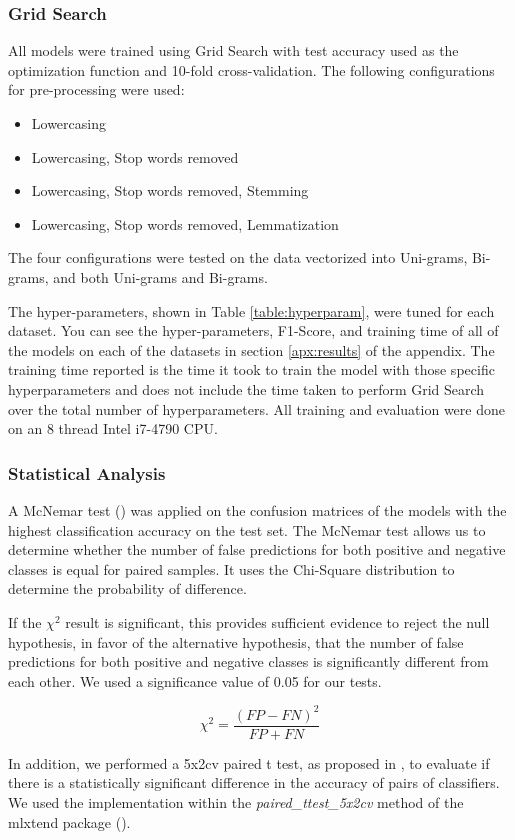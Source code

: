 \documentclass[a4paper, 11pt]{article}
\begin{document}
\begin{multicols}{2}
\subsubsection{Grid Search}
All models were trained using Grid Search with test accuracy used as the optimization function and 10-fold cross-validation. The following configurations for pre-processing were used:

\begin{itemize}\raggedright 
    \item Lowercasing
    \item Lowercasing, Stop words removed
    \item Lowercasing, Stop words removed, Stemming
    \item Lowercasing, Stop words removed, Lemmatization
\end{itemize}

The four configurations were tested on the data vectorized into Uni-grams, Bi-grams, and both Uni-grams and Bi-grams.

The hyper-parameters, shown in Table \ref{table:hyperparam}, were tuned for each dataset. You can see the hyper-parameters, F1-Score, and training time of all of the models on each of the datasets in section \ref{apx:results} of the appendix. The training time reported is the time it took to train the model with those specific hyperparameters and does not include the time taken to perform Grid Search over the total number of hyperparameters. All training and evaluation were done on an 8 thread Intel i7-4790 CPU.

\subsubsection{Statistical Analysis}
A McNemar test (\cite{mcnemar1947note}) was applied on the confusion matrices of the models with the highest classification accuracy on the test set. The McNemar test allows us to determine whether the number of false predictions for both positive and negative classes is equal for paired samples. It uses the Chi-Square distribution to determine the probability of difference.

If the $\chi^{2}$ result is significant, this provides sufficient evidence to reject the null hypothesis, in favor of the alternative hypothesis, that the number of false predictions for both positive and negative classes is significantly different from each other. We used a significance value of 0.05 for our tests.

\begin{equation}
     \chi ^{2}={\frac{(FP-FN)^{2}}{FP+FN}}
\end{equation}

In addition, we performed a 5x2cv paired t test, as proposed in \cite{dietterich1998approximate}, to evaluate if there is a statistically significant difference in the accuracy of pairs of classifiers. We used the implementation within the \emph{paired\_ttest\_5x2cv} method of the mlxtend package (\cite{raschkas_2018_mlxtend}).

\end{multicols}
\end{document}
